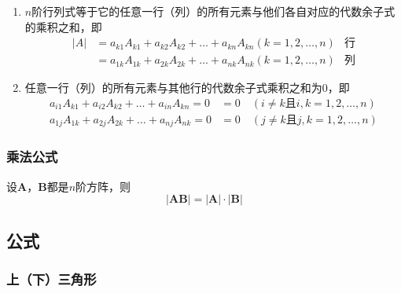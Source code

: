 \documentclass[a4paper,12pt]{article}
\begin{document}
    \begin{enumerate}
        \item $n$阶行列式等于它的任意一行（列）的所有元素与他们各自对应的代数余子式的乘积之和，即
        \begin{align*}
            |A| &= a_{k1}A_{k1} + a_{k2}A_{k2} + \dots + a_{kn}A_{kn} (k=1,2,\dots,n)  & \text{行} \\
            &= a_{1k}A_{1k} + a_{2k}A_{2k} + \dots + a_{nk}A_{nk} (k=1,2,\dots,n)  & \text{列}
        \end{align*}
        \item 任意一行（列）的所有元素与其他行的代数余子式乘积之和为0，即
        \begin{align*}
            a_{i1}A_{k1} + a_{i2}A_{k2} + \dots + a_{in}A_{kn} = 0 &= 0  \quad  (i \neq k \text{且} i,k=1,2,\dots,n)   \\
            a_{1j}A_{1k} + a_{2j}A_{2k} + \dots + a_{nj}A_{nk} = 0 &= 0  \quad  (j \neq k \text{且} j,k=1,2,\dots,n)
        \end{align*}
    \end{enumerate}

    \subsubsection{乘法公式}
    设$\mathbf{A}$，$\mathbf{B}$都是$n$阶方阵，则
    \[
        |\mathbf{AB}| = |\mathbf{A}| \cdot |\mathbf{B}|
    \]

    \subsection{公式}

    \subsubsection{上（下）三角形}
\end{document}
